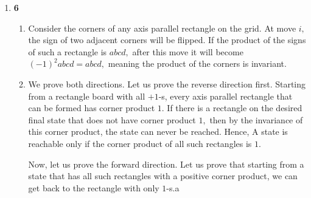 \documentclass[12pt]{article}
\begin{document}
\begin{enumerate}
    Since elements that can be swapped must be adjacent, $P_{r,
    s}(\sigma_i) = 0,$ meaning $K(\sigma_{i + 1}) = K(\sigma_i) + 1 =
    K(a_1, \ldots, a_n) + i.$ Hence, at turn
    $$
    i = \dfrac{n(n-1)}{2} - K(a_1, \ldots, a_n),
    $$
    we will have a sorted array, regardless of which moves are chosen.

  \item \textbf{6}
    \begin{enumerate}
      \item Consider the corners of any axis parallel rectangle on
        the grid. At move $i,$ the sign of two adjacent corners will
        be flipped. If the product of the signs of such a rectangle
        is $abcd,$ after this move it will become $(-1)^2abcd =
        abcd,$ meaning the product of the corners is invariant.

      \item We prove both directions. Let us prove the reverse
        direction first. Starting from a rectangle board with all
        $+1$-s, every axis parallel rectangle that can be formed has
        corner product $1.$ If there is a rectangle on the desired
        final state that does not have corner product $1,$ then by
        the invariance of this corner product, the state can never be
        reached. Hence, A state is reachable only if the corner
        product of all such rectangles is $1.$

        Now, let us prove the forward direction. Let us prove that
        starting from a state that has all such rectangles with a
        positive corner product, we can get back to the rectangle
        with only $1$-s.a


\end{enumerate}
\end{enumerate}
\end{document}
